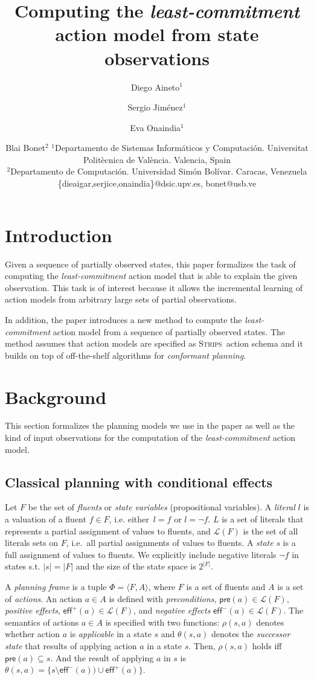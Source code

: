 \documentclass{article}
\title{Computing the {\em least-commitment} action model from state observations}
\author{
Diego Aineto$^1$\and
Sergio Jim\'enez$^1$\and
Eva Onaindia$^1$\And
\and
Blai Bonet$^2$
\affiliations
$^1${\small Departamento de Sistemas Inform\'aticos y Computaci\'on. Universitat Polit\`ecnica de Val\`encia. Valencia, Spain}\\
$^2${\small Departamento de Computaci\'on. Universidad Sim\'on Bolívar. Caracas, Venezuela}
\emails
{\scriptsize \{dieaigar,serjice,onaindia\}@dsic.upv.es, bonet@usb.ve}}
\newcommand{\tup}[1]{{\langle #1 \rangle}}
\newcommand{\pre}{\mathsf{pre}}     %
\newcommand{\eff}{\mathsf{eff}}     %
\newcommand{\strips}{\textsc{Strips}}
\begin{document}
\maketitle

\begin{abstract}
  
\end{abstract}

\section{Introduction}
Given a sequence of partially observed states, this paper formalizes the task of computing the {\em least-commitment} action model that is able to explain the given observation. This task is of interest because it allows the incremental learning of action models from arbitrary large sets of partial observations.

In addition, the paper introduces a new method to compute the {\em least-commitment} action model from a sequence of partially observed states. The method assumes that action models are specified as \strips\ action schema and it builds on top of off-the-shelf algorithms for {\em conformant planning}.



\section{Background}
This section formalizes the planning models we use in the paper as well as the kind of input observations for the computation of the {\em least-commitment} action model.  

\subsection{Classical planning with conditional effects}
Let $F$ be the set of {\em fluents} or {\em state variables} (propositional variables). A {\em literal} $l$ is a valuation of a fluent $f\in F$, i.e. either~$l=f$ or $l=\neg f$. $L$ is a set of literals that represents a partial assignment of values to fluents, and $\mathcal{L}(F)$ is the set of all literals sets on $F$, i.e.~all partial assignments of values to fluents. A {\em state} $s$ is a full assignment of values to fluents. We explicitly include negative literals $\neg f$ in states s.t. $|s|=|F|$ and the size of the state space is $2^{|F|}$.

A {\em planning frame} is a tuple $\Phi=\tup{F,A}$, where $F$ is a set of fluents and $A$ is a set of \emph{actions}. An action $a\in A$ is defined with {\em preconditions}, $\pre(a)\in\mathcal{L}(F)$, {\em positive effects}, $\eff^+(a)\in\mathcal{L}(F)$, and {\em negative effects} $\eff^-(a)\in\mathcal{L}(F)$. The semantics of actions $a\in A$ is specified with two functions: $\rho(s,a)$ denotes whether action $a$ is {\em applicable} in a state $s$ and $\theta(s,a)$ denotes the {\em successor state} that results of applying action $a$ in a state $s$. Then, $\rho(s,a)$ holds iff $\pre(a)\subseteq s$. And the result of applying $a$ in $s$ is $\theta(s,a)=\{s\setminus\eff^-(a))\cup\eff^+(a)\}$.
\end{document}
